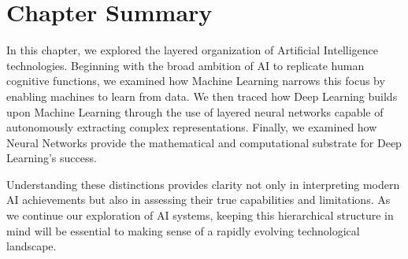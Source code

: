 \documentclass{book}
\begin{document}
\section{Chapter Summary}

In this chapter, we explored the layered organization of Artificial Intelligence
technologies. Beginning with the broad ambition of AI to replicate human 
cognitive functions, we examined how Machine Learning narrows this focus by 
enabling machines to learn from data. We then traced how Deep Learning builds 
upon Machine Learning through the use of layered neural networks capable of 
autonomously extracting complex representations. Finally, we examined how 
Neural Networks provide the mathematical and computational substrate for Deep 
Learning's success.

Understanding these distinctions provides clarity not only in interpreting 
modern AI achievements but also in assessing their true capabilities and 
limitations. As we continue our exploration of AI systems, keeping this 
hierarchical structure in mind will be essential to making sense of a 
rapidly evolving technological landscape.
\end{document}
